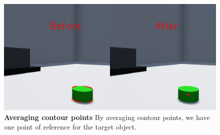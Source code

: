 \begin{figure}[htbp]
    \centering
    \includegraphics[width=0.9\columnwidth]{figures/src/contour_and_average.png}
    \caption{
	    \textbf{Averaging contour points} By averaging contour points, we have one point of reference for the target object.
    }
    \label{fig:contour_and_average}
\end{figure}
